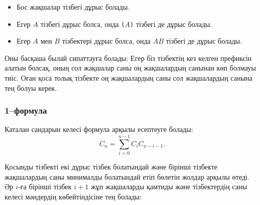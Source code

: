 \begin{itemize}
\item Бос жақшалар тізбегі дұрыс болады.
\item Егер $A$ тізбегі дұрыс болса,
онда \texttt{(}$A$\texttt{)} тізбегі де дұрыс болады.
\item Егер  $A$ мен $B$ тізбектері дұрыс болса,
онда $AB$ тізбегі де дұрыс болады.
\end{itemize}


Оны басқаша былай сипаттауға болады:
Егер біз тізбектің кез келген префиксін алатын болсақ,
оның сол жақшалар саны оң жақшалардың санынан көп болмауы тиіс.
Оған қоса толық тізбекте оң жақшалардың саны сол жақшалардың 
санына тең болуы керек. 


\subsubsection{1–формула}

Каталан сандарын келесі формула арқылы есептеуге болады:
\[ C_n = \sum_{i=0}^{n-1} C_{i} C_{n-i-1}.\]


Қосынды тізбекті екі дұрыс тізбек болатындай және
бірінші тізбекте жақшалардың саны минималды болатындай етіп бөлетін
жолдар арқылы өтеді. Әр $i$-ға бірінші тізбек $i+1$ жұп 
жақшаларды қамтиды және тізбектердің саны келесі
мәндердің көбейтіндісіне тең болады:


